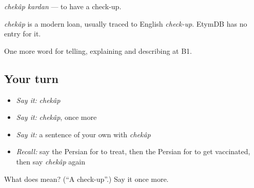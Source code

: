 \emph{chekâp kardan} — to have a check-up.

\begin{cousinweb}
\emph{chekâp} is a modern loan, usually traced to English \emph{check-up}. EtymDB has no entry for it.
\end{cousinweb}

\begin{grammarlens}[title={What you've built}]
One more word for telling, explaining and describing at B1.
\end{grammarlens}

\subsection*{Your turn}
\begin{itemize}
\raggedright
  \item \emph{Say it:} \emph{chekâp}
  \item \emph{Say it:} \emph{chekâp}, once more
  \item \emph{Say it:} a sentence of your own with \emph{chekâp}
  \item \emph{Recall:} say the Persian for to treat, then the Persian for to get vaccinated, then say \emph{chekâp} again
\end{itemize}

\begin{tcolorbox}[breakable,colback=teal!4,colframe=teal!35!black,title={Before you move on}]
What does  mean? (\textquotedblleft{}A check-up\textquotedblright{}.) Say it once more.
\end{tcolorbox}
